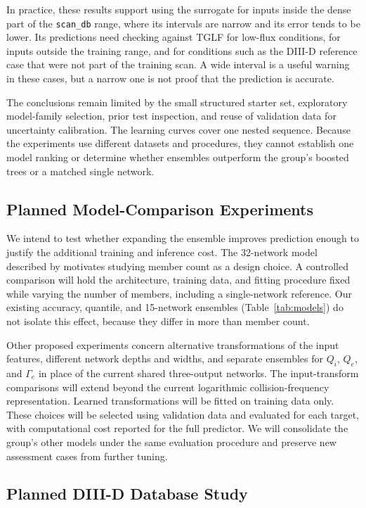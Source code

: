 \documentclass[12pt,letterpaper]{article}
\begin{document}
In practice, these results support using the surrogate for inputs inside the
dense part of the \texttt{scan\_db} range, where its intervals are narrow and
its error tends to be lower. Its predictions need checking against TGLF for
low-flux conditions, for inputs outside the training range, and for conditions
such as the DIII-D reference case that were not part of the training scan. A
wide interval is a useful warning in these cases, but a narrow one is not proof
that the prediction is accurate.

The conclusions remain limited by the small structured starter set,
exploratory model-family selection, prior test inspection, and reuse of
validation data for uncertainty calibration. The learning curves cover one
nested sequence. Because the experiments use different datasets and
procedures, they cannot establish one model ranking or determine whether
ensembles outperform the group's boosted trees or a matched single network.

\subsection{Planned Model-Comparison Experiments}

We intend to test whether expanding the ensemble improves prediction enough
to justify the additional training and inference cost. The 32-network model
described by \citet{meneghini2017} motivates studying member count as a design
choice. A controlled comparison will hold the architecture, training data,
and fitting procedure fixed while varying the number of members, including
a single-network reference. Our existing accuracy, quantile, and 15-network
ensembles (Table~\ref{tab:models}) do not isolate this effect, because they
differ in more than member count.

Other proposed experiments concern alternative transformations of the input
features, different network depths and widths, and separate ensembles for
$Q_i$, $Q_e$, and $\Gamma_e$ in place of the current shared three-output
networks. The input-transform comparisons will extend beyond the current
logarithmic collision-frequency representation. Learned transformations will
be fitted on training data only. These choices will be selected using
validation data and evaluated for each target, with computational cost
reported for the full predictor. We will consolidate the group's other models
under the same evaluation procedure and preserve new assessment cases from
further tuning.

\subsection{Planned DIII-D Database Study}
\end{document}
